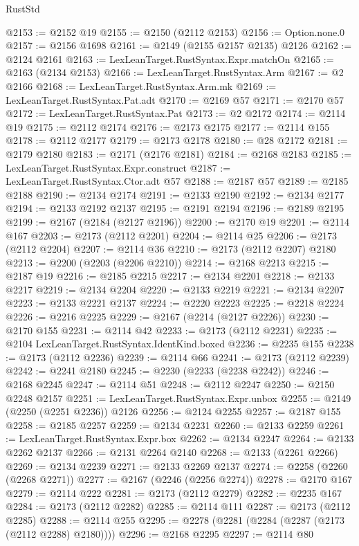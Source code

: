\begin{lexlean}{RustStd}
\begin{coremodule}
@2153 := @2152 @19
@2155 := @2150 (@2112 @2153)
@2156 := Option.none.{0}
@2157 := @2156 @1698
@2161 := @2149 (@2155 @2157 @2135) @2126
@2162 := @2124 @2161
@2163 := LexLeanTarget.RustSyntax.Expr.matchOn
@2165 := @2163 (@2134 @2153)
@2166 := LexLeanTarget.RustSyntax.Arm
@2167 := @2 @2166
@2168 := LexLeanTarget.RustSyntax.Arm.mk
@2169 := LexLeanTarget.RustSyntax.Pat.adt
@2170 := @2169 @57
@2171 := @2170 @57
@2172 := LexLeanTarget.RustSyntax.Pat
@2173 := @2 @2172
@2174 := @2114 @19
@2175 := @2112 @2174
@2176 := @2173 @2175
@2177 := @2114 @155
@2178 := @2112 @2177
@2179 := @2173 @2178
@2180 := @28 @2172
@2181 := @2179 @2180
@2183 := @2171 (@2176 @2181)
@2184 := @2168 @2183
@2185 := LexLeanTarget.RustSyntax.Expr.construct
@2187 := LexLeanTarget.RustSyntax.Ctor.adt @57
@2188 := @2187 @57
@2189 := @2185 @2188
@2190 := @2134 @2174
@2191 := @2133 @2190
@2192 := @2134 @2177
@2194 := @2133 @2192 @2137
@2195 := @2191 @2194
@2196 := @2189 @2195
@2199 := @2167 (@2184 (@2127 @2196))
@2200 := @2170 @19
@2201 := @2114 @167
@2203 := @2173 (@2112 @2201)
@2204 := @2114 @25
@2206 := @2173 (@2112 @2204)
@2207 := @2114 @36
@2210 := @2173 (@2112 @2207) @2180
@2213 := @2200 (@2203 (@2206 @2210))
@2214 := @2168 @2213
@2215 := @2187 @19
@2216 := @2185 @2215
@2217 := @2134 @2201
@2218 := @2133 @2217
@2219 := @2134 @2204
@2220 := @2133 @2219
@2221 := @2134 @2207
@2223 := @2133 @2221 @2137
@2224 := @2220 @2223
@2225 := @2218 @2224
@2226 := @2216 @2225
@2229 := @2167 (@2214 (@2127 @2226))
@2230 := @2170 @155
@2231 := @2114 @42
@2233 := @2173 (@2112 @2231)
@2235 := @2104 LexLeanTarget.RustSyntax.IdentKind.boxed
@2236 := @2235 @155
@2238 := @2173 (@2112 @2236)
@2239 := @2114 @66
@2241 := @2173 (@2112 @2239)
@2242 := @2241 @2180
@2245 := @2230 (@2233 (@2238 @2242))
@2246 := @2168 @2245
@2247 := @2114 @51
@2248 := @2112 @2247
@2250 := @2150 @2248 @2157
@2251 := LexLeanTarget.RustSyntax.Expr.unbox
@2255 := @2149 (@2250 (@2251 @2236)) @2126
@2256 := @2124 @2255
@2257 := @2187 @155
@2258 := @2185 @2257
@2259 := @2134 @2231
@2260 := @2133 @2259
@2261 := LexLeanTarget.RustSyntax.Expr.box
@2262 := @2134 @2247
@2264 := @2133 @2262 @2137
@2266 := @2131 @2264 @2140
@2268 := @2133 (@2261 @2266)
@2269 := @2134 @2239
@2271 := @2133 @2269 @2137
@2274 := @2258 (@2260 (@2268 @2271))
@2277 := @2167 (@2246 (@2256 @2274))
@2278 := @2170 @167
@2279 := @2114 @222
@2281 := @2173 (@2112 @2279)
@2282 := @2235 @167
@2284 := @2173 (@2112 @2282)
@2285 := @2114 @111
@2287 := @2173 (@2112 @2285)
@2288 := @2114 @255
@2295 := @2278 (@2281 (@2284 (@2287 (@2173 (@2112 @2288) @2180))))
@2296 := @2168 @2295
@2297 := @2114 @80

\end{coremodule}
\end{lexlean}
